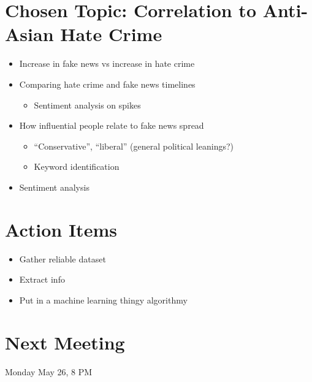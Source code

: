 \documentclass[12pt]{article}
\begin{document}
\section{Chosen Topic: Correlation to Anti-Asian Hate Crime}
\begin{itemize}
    \begin{itemize}
        \item Increase in fake news vs increase in hate crime
        \item Comparing hate crime and fake news timelines
        \begin{itemize}
            \item Sentiment analysis on spikes 
        \end{itemize}
        \item How influential people relate to fake news spread
        \begin{itemize}
            \item “Conservative”, “liberal” (general political leanings?)
            \item Keyword identification
        \end{itemize}
        \item Sentiment analysis
    \end{itemize}
\end{itemize}

\section{Action Items}
\begin{itemize}
    \item Gather reliable dataset
    \item Extract info
    \item Put in a machine learning thingy algorithmy
\end{itemize}

\section{Next Meeting}
Monday May 26, 8 PM
\end{document}
